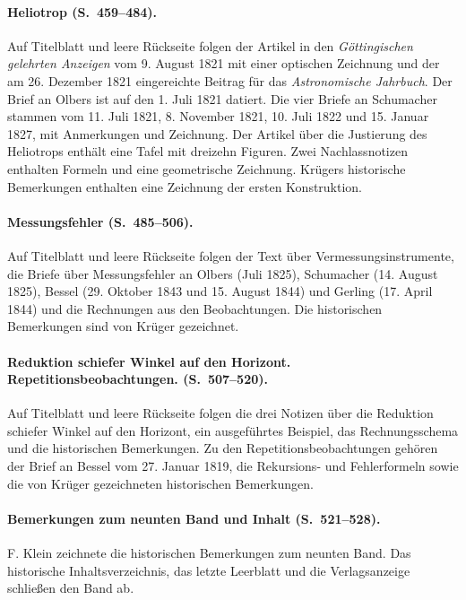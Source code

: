 \paragraph{Heliotrop (S.~459--484).}
Auf Titelblatt und leere Rückseite folgen der Artikel in den \textit{Göttingischen gelehrten Anzeigen} vom 9. August 1821 mit einer optischen Zeichnung und der am 26. Dezember 1821 eingereichte Beitrag für das \textit{Astronomische Jahrbuch}. Der Brief an Olbers ist auf den 1. Juli 1821 datiert. Die vier Briefe an Schumacher stammen vom 11. Juli 1821, 8. November 1821, 10. Juli 1822 und 15. Januar 1827, mit Anmerkungen und Zeichnung. Der Artikel über die Justierung des Heliotrops enthält eine Tafel mit dreizehn Figuren. Zwei Nachlassnotizen enthalten Formeln und eine geometrische Zeichnung. Krügers historische Bemerkungen enthalten eine Zeichnung der ersten Konstruktion.

\paragraph{Messungsfehler (S.~485--506).}
Auf Titelblatt und leere Rückseite folgen der Text über Vermessungsinstrumente, die Briefe über Messungsfehler an Olbers (Juli 1825), Schumacher (14. August 1825), Bessel (29. Oktober 1843 und 15. August 1844) und Gerling (17. April 1844) und die Rechnungen aus den Beobachtungen. Die historischen Bemerkungen sind von Krüger gezeichnet.

\paragraph{Reduktion schiefer Winkel auf den Horizont. Repetitionsbeobachtungen. (S.~507--520).}
Auf Titelblatt und leere Rückseite folgen die drei Notizen über die Reduktion schiefer Winkel auf den Horizont, ein ausgeführtes Beispiel, das Rechnungsschema und die historischen Bemerkungen. Zu den Repetitionsbeobachtungen gehören der Brief an Bessel vom 27. Januar 1819, die Rekursions- und Fehlerformeln sowie die von Krüger gezeichneten historischen Bemerkungen.

\paragraph{Bemerkungen zum neunten Band und Inhalt (S.~521--528).}
F. Klein zeichnete die historischen Bemerkungen zum neunten Band. Das historische Inhaltsverzeichnis, das letzte Leerblatt und die Verlagsanzeige schließen den Band ab.

